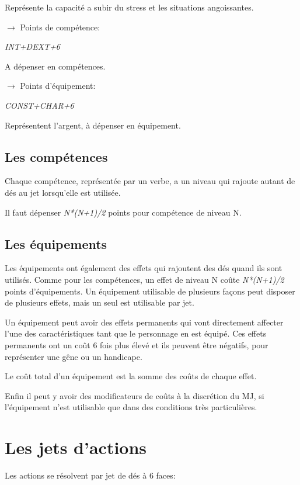 \begin{landscape}
\begin{multicols}{4}
Représente la capacité a subir du stress et les situations angoissantes.



$\rightarrow$ Points de compétence:

\textit{INT+DEXT+6}

A dépenser en compétences.


$\rightarrow$ Points d'équipement:	

\textit{CONST+CHAR+6}

Représentent l'argent, à dépenser en équipement. 

\subsection{Les compétences}

Chaque compétence, représentée par un verbe, a un niveau qui rajoute autant de dés au jet lorsqu'elle est utilisée.
	
Il faut dépenser \textit{N*(N+1)/2} points pour compétence de niveau N.


\subsection{Les équipements}

Les équipements ont également des effets qui rajoutent des dés quand ils sont utilisés. 
Comme pour les compétences, un effet de niveau N coûte \textit{N*(N+1)/2} points d'équipements.
Un équipement utilisable de plusieurs façons peut disposer de plusieurs effets, mais un seul est utilisable par jet. 

Un équipement peut avoir des effets permanents qui vont directement affecter l'une des caractéristiques tant que le personnage en est équipé.
Ces effets permanents ont un coût 6 fois plus élevé et ils peuvent être négatifs, pour représenter une gêne ou un handicape.

Le coût total d'un équipement est la somme des coûts de chaque effet.

Enfin il peut y avoir des modificateurs de coûts à la discrétion du MJ, si l'équipement n'est utilisable que dans des conditions très particulières.


\section{Les jets d'actions}
	
Les actions se résolvent par jet de dés à 6 faces: 


\end{multicols}
\end{landscape}
